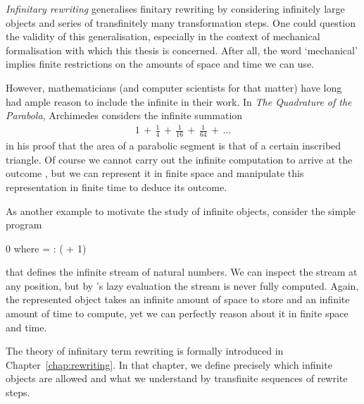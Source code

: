 
\emph{Infinitary rewriting} generalises finitary rewriting by
considering infinitely large objects and series of transfinitely many
transformation steps. One could question the validity of this
generalisation, especially in the context of mechanical formalisation
with which this thesis is concerned. After all, the word `mechanical'
implies finite restrictions on the amounts of space and time we can
use.


However, mathematicians (and computer scientists for that matter) have
long had ample reason to include the infinite in their work. In
\emph{The Quadrature of the Parabola}, Archimedes considers the
infinite summation
\begin{align*}
  1 \,+\, \frac{1}{4} \,+\, \frac{1}{16} \,+\, \frac{1}{64} \,+\, \ldots
\end{align*}
in his proof that the area of a parabolic segment is  that
of a certain inscribed triangle. Of course we cannot carry out the
infinite computation to arrive at the outcome , but we can
represent it in finite space and manipulate this representation in
finite time to deduce its outcome.

As another example to motivate the study of infinite objects, consider
the simple \Haskell program
\begin{singlespace}
\begin{coqdoccode}
\coqdocnoindent
{} 0 \coqdocindent{0.2em} \textsf{where}
\coqdocindent{0.2em}   =
 : 
( + 1)\coqdoceol
\end{coqdoccode}
\end{singlespace}
that defines the infinite stream of natural numbers. We can inspect
the stream at any position, but by \Haskell's lazy evaluation the
stream is never fully computed. Again, the represented object takes an
infinite amount of space to store and an infinite amount of time to
compute, yet we can perfectly reason about it in finite space and
time.

The theory of infinitary term rewriting is formally introduced in
Chapter~\ref{chap:rewriting}. In that chapter, we define precisely
which infinite objects are allowed and what we understand by
transfinite sequences of rewrite steps.


